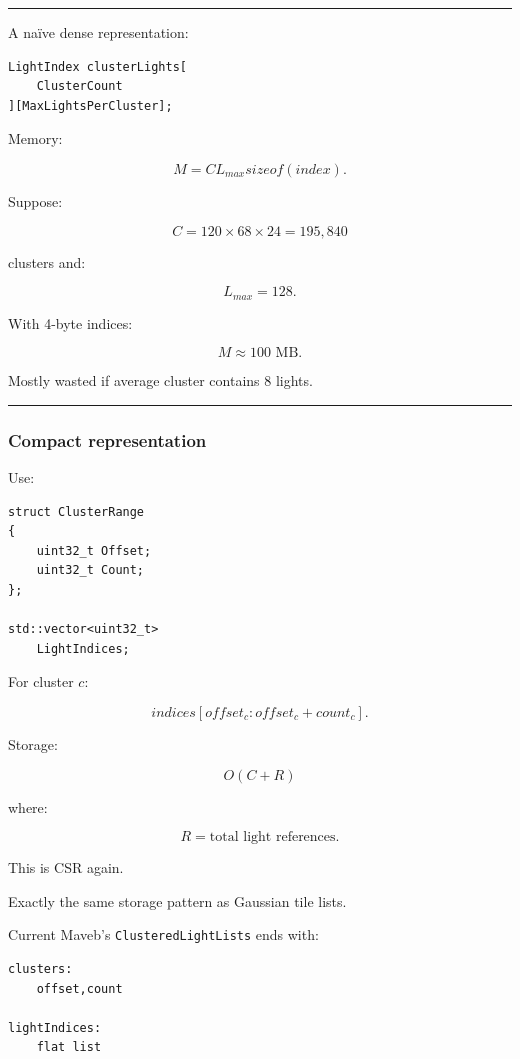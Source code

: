 \begin{center}\rule{0.5\linewidth}{0.5pt}\end{center}

A naïve dense representation:

\begin{verbatim}
LightIndex clusterLights[
    ClusterCount
][MaxLightsPerCluster];
\end{verbatim}

Memory:

\[
M=
C
L_{max}
sizeof(index).
\]

Suppose:

\[
C=120\times68\times24
=
195,840
\]

clusters and:

\[
L_{max}=128.
\]

With 4-byte indices:

\[
M\approx100\text{ MB}.
\]

Mostly wasted if average cluster contains 8 lights.

\begin{center}\rule{0.5\linewidth}{0.5pt}\end{center}

\subsubsection{Compact representation}\label{compact-representation}

Use:

\begin{verbatim}
struct ClusterRange
{
    uint32_t Offset;
    uint32_t Count;
};

std::vector<uint32_t>
    LightIndices;
\end{verbatim}

For cluster \(c\):

\[
indices[
offset_c:
offset_c+count_c
].
\]

Storage:

\[
O(C+R)
\]

where:

\[
R=
\text{total light references}.
\]

This is CSR again.

Exactly the same storage pattern as Gaussian tile lists.

Current Maveb's \texttt{ClusteredLightLists} ends with:

\begin{verbatim}
clusters:
    offset,count

lightIndices:
    flat list
\end{verbatim}

